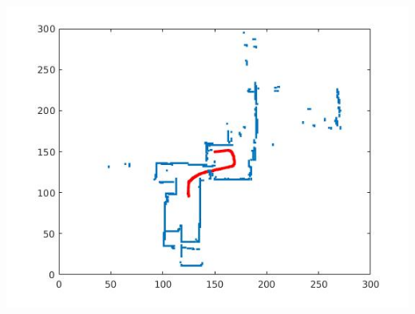 \documentclass[english]{article}
\begin{document}
\includegraphics[scale=0.8]{map3.jpg}\\
\end{document}
